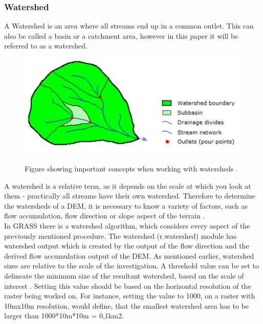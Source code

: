 \subsubsection{Watershed}
A Watershed is an area where all streams end up in a common outlet. This can also be called a basin or a catchment area, however in this paper it will be referred to as a watershed.\\

\begin{figure}[h]
\centering
	{\includegraphics[width=\linewidth]{gfx/Watershed.png}}
\caption{Figure showing important concepts when working with watersheds \citep{watershed}.}
\end{figure}

A watershed is a relative term, as it depends on the scale at which you look at them - practically all streams have their own watershed. Therefore to determine the watersheds of a DEM, it is necessary to know a variety of factors, such as flow accumulation, flow direction or slope aspect of the terrain \citep{rwatershed}.\\

In  GRASS there is a watershed algorithm, which considers every aspect of the previously mentioned procedure. The watershed (r.watershed) module has watershed output which is created by the output of the flow direction and the derived flow accumulation output of the DEM. As mentioned earlier, watershed sizes are relative to the scale of the investigation. A threshold value can be set to delineate the minimum size of the resultant watershed, based on the scale of interest \citep{grassbook} \citep{rwatershed}. Setting this value should be based on the horizontal resolution of the raster being worked on. For instance, setting the value to 1000, on a raster with 10mx10m resolution, would define, that the smallest watershed area has to be larger than 1000*10m*10m = 0,1km2.

